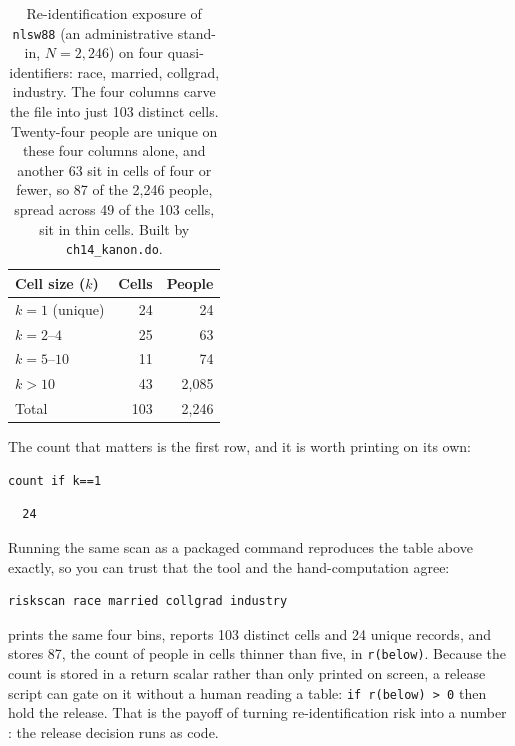 \begin{table}[htbp]
\centering
{\footnotesize
\begin{tabular}{lrr}
\hline
Cell size ($k$) & Cells & People \\
\hline
$k=1$ (unique)   &  24 &    24 \\
$k=2$--$4$        &  25 &    63 \\
$k=5$--$10$       &  11 &    74 \\
$k>10$            &  43 & 2{,}085 \\
\hline
Total            & 103 & 2{,}246 \\
\hline
\end{tabular}
}
\caption[$k$-anonymity of four ordinary columns]{Re-identification exposure of \texttt{nlsw88} (an administrative stand-in, $N=2{,}246$) on four quasi-identifiers: race, married, collgrad, industry. The four columns carve the file into just 103 distinct cells. Twenty-four people are unique on these four columns alone, and another 63 sit in cells of four or fewer, so 87 of the 2{,}246 people, spread across 49 of the 103 cells, sit in thin cells. Built by \texttt{ch14\_kanon.do}.}
\label{tab:kanon}
\end{table}

The count that matters is the first row, and it is worth printing on its own:
\par
{\footnotesize
\begin{verbatim}
count if k==1
\end{verbatim}
}
\par
{\footnotesize
\begin{verbatim}
  24
\end{verbatim}
}
Running the same scan as a packaged command reproduces the table above exactly, so you can trust that the tool and the hand-computation agree:
\par
{\footnotesize
\begin{verbatim}
riskscan race married collgrad industry
\end{verbatim}
}
prints the same four bins, reports 103 distinct cells and 24 unique records, and stores 87, the count of people in cells thinner than five, in \texttt{r(below)}. Because the count is stored in a return scalar rather than only printed on screen, a release script can gate on it without a human reading a table: \texttt{if r(below) > 0} then hold the release. That is the payoff of turning re-identification risk into a number \parencite{elemam2008kanon}: the release decision runs as code.

